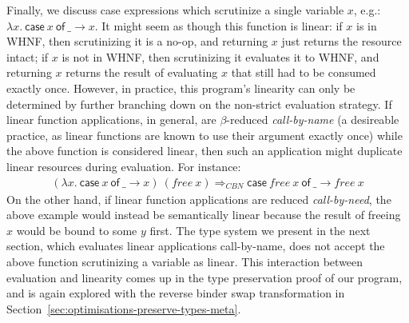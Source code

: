 \documentclass[acmsmall,review,anonymous]{acmart}
\newcommand{\parawith}[1]{\paragraph{\emph{#1}}}
\newcommand{\ccase}[2]{\mathsf{case}~#1~\mathsf{of}~#2}
\begin{document}
Finally, we discuss case expressions which scrutinize a
single variable $x$, e.g.:
$
\lambda x.~\ccase{x}{\_ \to x}
$. 
It might seem as though this function is linear:
if $x$ is in WHNF, then scrutinizing it is a no-op, and returning $x$
just returns the resource intact;
if $x$ is not in WHNF, then scrutinizing it evaluates it to WHNF, and returning
$x$ returns the result of evaluating $x$ that still had to be consumed exactly
once.
However, in practice, this program's linearity can only be determined by
further branching down on the non-strict evaluation strategy. If linear
function applications, in general, are $\beta$-reduced \emph{call-by-name} (a desireable
practice, as linear functions are known to use their argument exactly once)
while the above function is considered linear, then such an application might
duplicate linear resources during evaluation. For instance:
\[
\begin{array}{l}
(\lambda x.~\ccase{x}{\_ \to x})~(free~x)
\Longrightarrow_{CBN}
\ccase{free~x}{\_ \to free~x}
\end{array}
\]
On the other hand, if linear function applications are reduced
\emph{call-by-need}, the above example would instead be semantically linear
because the result of freeing $x$ would be bound to some $y$ first.
%
The type system we present in the next section, which evaluates linear
applications call-by-name, does not accept the above function scrutinizing a
variable as linear. 
This interaction between evaluation and linearity comes up in the type
preservation proof of our program, and is again explored with the reverse
binder swap transformation in
Section~\ref{sec:optimisations-preserve-types-meta}.

\end{document}
